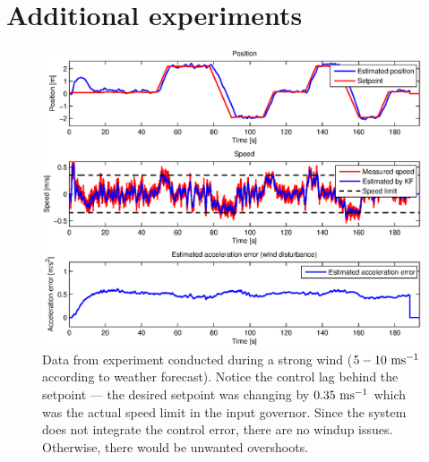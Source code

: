 \section{Additional experiments}\label{ape:experiments}
\begin{figure}[H]
\centering
\begin{sideways}
\includegraphics[scale=1]{fig/experiment_vitr_venku.eps}
\end{sideways}
\caption*{Data from experiment conducted during a strong wind ($5 - 10~\mathrm{ms^{-1}}$ according to weather forecast). Notice the control lag behind the setpoint --- the desired setpoint was changing by $0.35~\mathrm{ms^{-1}}$ which was the actual speed limit in the input governor. Since the system does not integrate the control error, there are no windup issues. Otherwise, there would be unwanted overshoots.}
\end{figure}